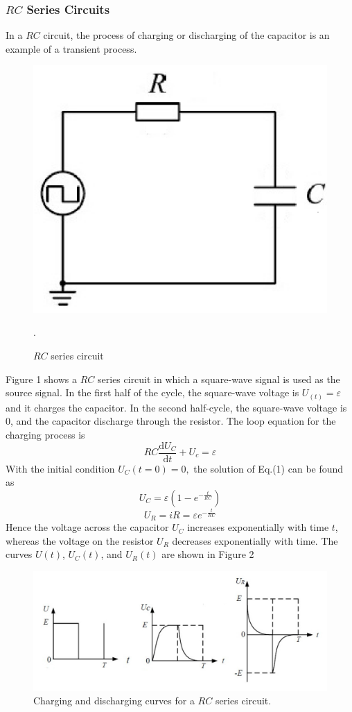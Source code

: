 \documentclass[12pt]{article}
\begin{document}
\subsubsection{$RC$ Series Circuits}
In a $RC$ circuit, the process of charging or discharging of the capacitor is an example
of a transient process.
\begin{figure}[H]
\centering
\includegraphics[scale=0.4]{P1.jpg}
\caption{$RC$ series circuit}.
\end{figure}
Figure 1 shows a $RC$ series circuit in which a square-wave signal is used as the source signal. In the first half of the cycle, the square-wave voltage is $U_(t)=\varepsilon$ and it charges the capacitor. In the second half-cycle, the square-wave voltage is 0, and the capacitor discharge through the resistor. The loop equation for the charging process is 
\begin{equation}
RC\frac{\mathrm{d}U_C}{\mathrm{d}t}+U_c=\varepsilon
\end{equation}
With the initial condition $U_C(t=0)=0,$ the solution of Eq.(1) can be found as
$$U_C=\varepsilon(1-e^{-\frac{t}{RC}})$$
$$U_R=iR=\varepsilon e^{-\frac{t}{RC}}$$
Hence the voltage across the capacitor $U_C$ increases exponentially with time $t$, whereas the voltage on the resistor $U_R$ decreases exponentially with time. The curves $U(t)$, $U_C(t)$,
and $U_R(t)$ are shown in Figure 2
\begin{figure}[H]
\centering
\includegraphics[scale=0.4]{P2.jpg}
\caption{Charging and discharging curves for a $RC$ series circuit.}
\end{figure}
\end{document}

